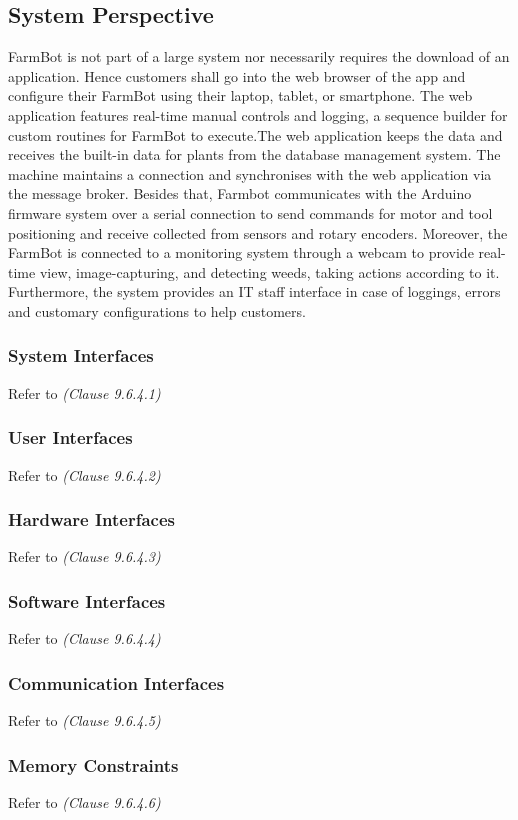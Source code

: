 \subsection{System Perspective}

FarmBot is not part of a large system nor necessarily requires the download of an application. Hence customers shall go into the web browser of the app and configure their FarmBot using their laptop, tablet, or smartphone.
The web application features real-time manual controls and logging, a sequence builder for custom routines for FarmBot to execute.The web application keeps the data and receives the built-in data for plants from the database management system. The machine maintains a connection and synchronises with the web application via the message broker. Besides that, Farmbot communicates with the Arduino firmware system over a serial connection to send commands for motor and tool positioning and receive collected from sensors and rotary encoders. Moreover, the FarmBot is connected to a monitoring system through a webcam to provide real-time view, image-capturing, and detecting weeds, taking actions according to it. Furthermore, the system provides an IT staff interface in case of loggings, errors and customary configurations to help customers.

\subsubsection{System Interfaces}
Refer to \textit{(Clause 9.6.4.1)}
\subsubsection{User Interfaces}
Refer to \textit{(Clause 9.6.4.2)}
\subsubsection{Hardware Interfaces}
Refer to \textit{(Clause 9.6.4.3)}
\subsubsection{Software Interfaces}
Refer to \textit{(Clause 9.6.4.4)}
\subsubsection{Communication Interfaces}
Refer to \textit{(Clause 9.6.4.5)}
\subsubsection{Memory Constraints}
Refer to \textit{(Clause 9.6.4.6)}
